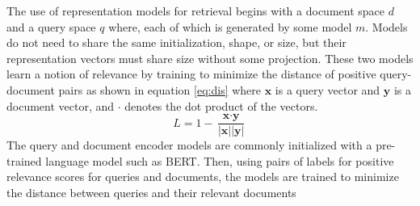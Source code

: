 The use of representation models for retrieval begins with a document space $d$ and a query space $q$ where, each of which is generated by some model $m$. Models do not need to share the same initialization, shape, or size, but their representation vectors must share size without some projection. These two models learn a notion of relevance by training to minimize the distance of positive query-document pairs as shown in equation \ref{eq:dis} where $\textbf{x}$ is a query vector and $\textbf{y}$ is a document vector, and $\cdot$ denotes the dot product of the vectors.\\
\begin{equation}
L = 1 - \frac{\textbf{x} \cdot \textbf{y}}{|\textbf{x}||\textbf{y}|}
 \label{eq:dis}
\end{equation}
The query and document encoder models are commonly initialized with a pre-trained language model such as BERT. Then, using pairs of labels for positive relevance scores for queries and documents, the models are trained to minimize the distance between queries and their relevant documents \cite{Karpukhin2020DensePR} \\
